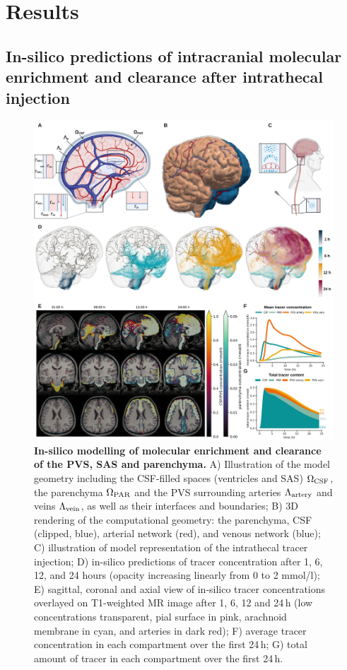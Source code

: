 \documentclass[fleqn,10pt]{wlscirep}
\begin{document}
\section*{Results}

\subsection*{In-silico predictions of intracranial molecular enrichment and clearance after intrathecal injection}
\begin{figure}
    \centering
    \includegraphics[width=1\textwidth]{figures/figure1.png}
     \caption{
     \textbf{In-silico modelling of molecular enrichment and clearance of the PVS, SAS and parenchyma.}
     A) Illustration of the model geometry including the CSF-filled spaces (ventricles and SAS) $\Omega_{\rm CSF}$, the parenchyma $\Omega_{\rm PAR}$ and the PVS surrounding arteries $\Lambda_{\rm artery}$ and veins $\Lambda_{\rm vein}$, as well as their interfaces and boundaries; 
     B) 3D rendering of the computational geometry: the parenchyma, CSF (clipped, blue), arterial network (red), and venous network (blue); 
     C) illustration of model representation of the intrathecal tracer injection; 
     D) in-silico predictions of tracer concentration after 1, 6, 12, and 24 hours (opacity increasing linearly from 0 to 2 mmol/l); 
     E) sagittal, coronal and axial view of in-silico tracer concentrations overlayed on T1-weighted MR image after 1, 6, 12 and 24\,h (low concentrations transparent, pial surface in pink, arachnoid membrane in cyan, and arteries in dark red); 
     F) average tracer concentration in each compartment over the first 24\,h; 
     G) total amount of tracer in each compartment over the first 24\,h.}
     \label{fig:results1}
\end{figure}
\end{document}
